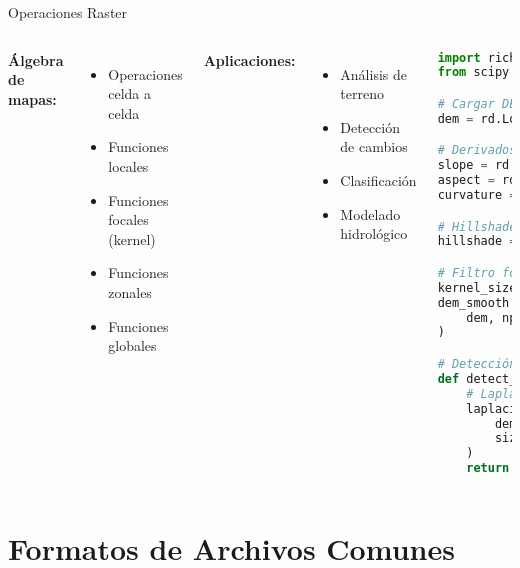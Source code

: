 \documentclass[10pt]{beamer}
\begin{document}
\begin{frame}[fragile]{Operaciones Raster}
    \begin{columns}
        \textbf{Álgebra de mapas:}
        \begin{itemize}
            \item Operaciones celda a celda
            \item Funciones locales
            \item Funciones focales (kernel)
            \item Funciones zonales
            \item Funciones globales
        \end{itemize}
        
        \vspace{0.3cm}
        \textbf{Aplicaciones:}
        \begin{itemize}
            \item Análisis de terreno
            \item Detección de cambios
            \item Clasificación
            \item Modelado hidrológico
        \end{itemize}
        
        \begin{lstlisting}[language=Python, caption=Análisis de terreno]
import richdem as rd
from scipy.ndimage import generic_filter

# Cargar DEM
dem = rd.LoadGDAL("srtm_chile.tif")

# Derivados del terreno
slope = rd.TerrainAttribute(dem, 'slope_degrees')
aspect = rd.TerrainAttribute(dem, 'aspect')
curvature = rd.TerrainAttribute(dem, 'curvature')

# Hillshade
hillshade = rd.hillshade(dem, azimuth=315)

# Filtro focal (media móvil 3x3)
kernel_size = 3
dem_smooth = generic_filter(
    dem, np.mean, size=kernel_size
)

# Detección de crestas
def detect_ridges(dem):
    # Laplaciano
    laplacian = generic_filter(
        dem, lambda x: x[4] - x.mean(), 
        size=(3,3)
    )
    return laplacian > threshold
        \end{lstlisting}
    \end{columns}
\end{frame}

\section{Formatos de Archivos Comunes}
\end{document}
